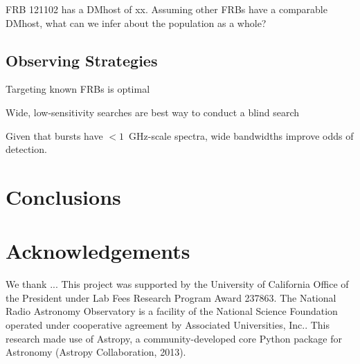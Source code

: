 \documentclass{emulateapj}
\begin{document}
FRB 121102 has a DMhost of xx. Assuming other FRBs have a comparable DMhost, what can we infer about the population as a whole?


\subsection{Observing Strategies}

Targeting known FRBs is optimal

Wide, low-sensitivity searches are best way to conduct a blind search

\cite{2016MNRAS.458L..89C}

Given that bursts have $<1$~GHz-scale spectra, wide bandwidths improve odds of detection.

\section{Conclusions}





\section*{Acknowledgements}
We thank ...
This project was supported by the University of California Office of the President under Lab Fees Research Program Award 237863. The National Radio Astronomy Observatory is a facility of the National Science Foundation operated under cooperative agreement by Associated Universities, Inc.. This research made use of Astropy, a community-developed core Python package for Astronomy (Astropy Collaboration, 2013).




\end{document}
